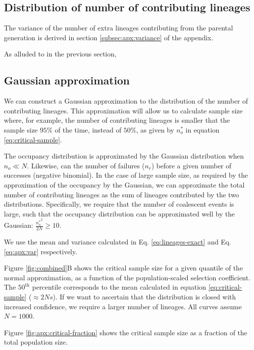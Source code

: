 \documentclass[review]{elsarticle}
\newcommand{\sgcomment}[1]{{\color{red}{SG: #1}}}
\begin{document}
\subsection{Distribution of number of contributing lineages}
\label{subsec:distribution}

The variance of the number of extra lineages contributing from the parental generation is
derived in section \ref{subsec:apx:variance} of the appendix. \sgcomment{That doesn't seem to be the right place for this. }

As alluded to in the previous section, 

\subsection{Gaussian approximation}

We can construct a Gaussian approximation to the distribution of the number of contributing lineages.
This approximation will allow us to calculate sample size where, for example, the number of
contributing lineages is smaller that the sample size $95\%$ of the time, instead of $50\%$, as
given by $n_o^*$ in equation \eqref{eq:critical-sample}.

The occupancy distribution is approximated by the Gaussian distribution \citep{ONeill2019} when
$n_o \ll N$. Likewise, can the number of failures ($n_r$) before a given number of successes
(negative binomial). In the case of large sample size, as required by the approximation of the
occupancy by the Gaussian, we can approximate the total number of contributing lineages as the sum
of lineages contributed by the two distributions. Specifically, we require that the number of
coalescent events is large, such that the occupancy distribution can be approximated well by the
Gaussian: $\frac{{n_o^*}^2}{2N} \ge 10$.

We use the mean and variance calculated in Eq. \ref{eq:lineages-exact} and Eq. \ref{eq:apx:var}
respectively.

Figure \ref{fig:combined}B shows the critical sample size for a given quantile of the normal
approximation, as a function of the population-scaled selection coefficient. The $50^{\text{th}}$
percentile corresponds to the mean calculated in equation \ref{eq:critical-sample} ($\approx 2Ns$).
If we want to ascertain that the distribution is closed with increased confidence, we require a
larger number of lineages. All curves assume $N=1000$.

Figure \ref{fig:apx:critical-fraction} shows the critical sample size as a fraction of the total
population size.
\end{document}
